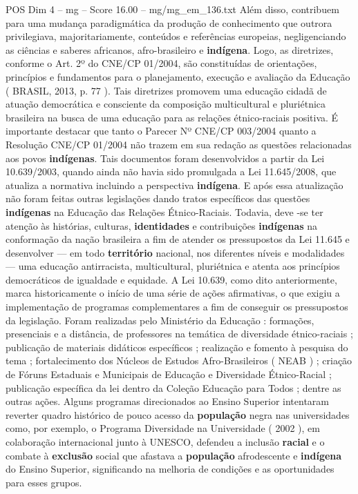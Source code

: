 \begin{textsample}{POS Dim 4 – mg – Score 16.00 – mg/mg\_em\_136.txt}
Além disso, contribuem para uma mudança paradigmática da produção de conhecimento que outrora privilegiava, majoritariamente, conteúdos e referências europeias, negligenciando as ciências e saberes africanos, afro-brasileiro e \textbf{indígena}.
Logo, as diretrizes, conforme o Art. 2º do CNE/CP 01/2004, são constituídas de orientações, princípios e fundamentos para o planejamento, execução e avaliação da Educação ( BRASIL, 2013, p. 77 ).
Tais diretrizes promovem uma educação cidadã de atuação democrática e consciente da composição multicultural e pluriétnica brasileira na busca de uma educação para as relações étnico-raciais positiva.
É importante destacar que tanto o Parecer Nº CNE/CP 003/2004 quanto a Resolução CNE/CP 01/2004 não trazem em sua redação as questões relacionadas aos povos \textbf{indígenas}.
Tais documentos foram desenvolvidos a partir da Lei 10.639/2003, quando ainda não havia sido promulgada a Lei 11.645/2008, que atualiza a normativa incluindo a perspectiva \textbf{indígena}.
E após essa atualização não foram feitas outras legislações dando tratos específicos das questões \textbf{indígenas} na Educação das Relações Étnico-Raciais.
Todavia, deve -se ter atenção às histórias, culturas, \textbf{identidades} e contribuições \textbf{indígenas} na conformação da nação brasileira a fim de atender os pressupostos da Lei 11.645 e desenvolver — em todo \textbf{território} nacional, nos diferentes níveis e modalidades — uma educação antirracista, multicultural, pluriétnica e atenta aos princípios democráticos de igualdade e equidade.
A Lei 10.639, como dito anteriormente, marca historicamente o início de uma série de ações afirmativas, o que exigiu a implementação de programas complementares a fim de conseguir os pressupostos da legislação.
Foram realizadas pelo Ministério da Educação : formações, presenciais e a distância, de professores na temática de diversidade étnico-raciais ; publicação de materiais didáticos específicos ; realização e fomento à pesquisa do tema ; fortalecimento dos Núcleos de Estudos Afro-Brasileiros ( NEAB ) ; criação de Fóruns Estaduais e Municipais de Educação e Diversidade Étnico-Racial ; publicação específica da lei dentro da Coleção Educação para Todos ; dentre as outras ações.
Alguns programas direcionados ao Ensino Superior intentaram reverter quadro histórico de pouco acesso da \textbf{população} negra nas universidades como, por exemplo, o Programa Diversidade na Universidade ( 2002 ), em colaboração internacional junto à UNESCO, defendeu a inclusão \textbf{racial} e o combate à \textbf{exclusão} social que afastava a \textbf{população} afrodescente e \textbf{indígena} do Ensino Superior, significando na melhoria de condições e as oportunidades para esses grupos.

\end{textsample}
